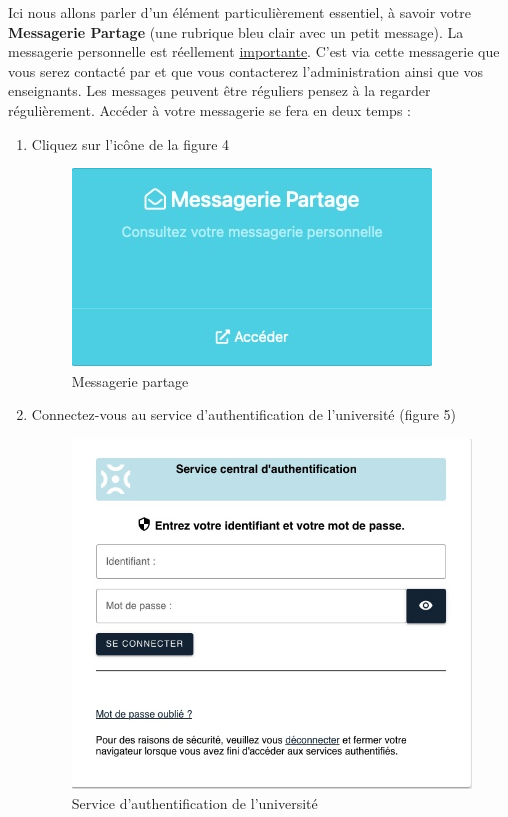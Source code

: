 \documentclass{article}
\begin{document}
\begin{exercice}

Ici nous allons parler d'un élément particulièrement essentiel, à savoir votre \textbf{Messagerie Partage}
(une rubrique bleu clair avec un petit message). La messagerie personnelle est réellement \underline{importante}.
C'est via cette messagerie que vous serez contacté par et que vous contacterez l'administration ainsi que vos enseignants. 
Les messages peuvent être réguliers pensez à la regarder régulièrement. 
Accéder à votre messagerie se fera en deux temps : 
\begin{enumerate}
\item Cliquez sur l'icône de la figure 4

\begin{figure}[h!]
    \begin{center}
    \includegraphics[scale=0.25]{messagerie.jpg}
    \caption{Messagerie partage}
     \end{center}
\end{figure}    

\item Connectez-vous au service d'authentification de l'université (figure 5)

\begin{figure}[h!]
    \begin{center}
    \includegraphics[scale=0.23]{authentification.jpg}
    \caption{Service d'authentification de l'université}
     \end{center}
\end{figure}    


\end{enumerate}
\end{exercice}
\end{document}
